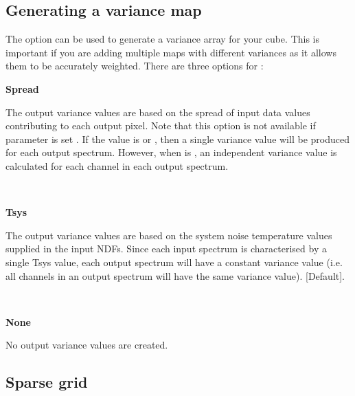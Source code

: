 \documentclass[11pt,oneside,chapters]{starlink}
\begin{document}
\subsection{Generating a variance map}

The option  can be used to generate a variance array for
your cube. This is important if you are adding multiple maps with
different variances as it allows them to be accurately weighted. There
are three options for :

\begin{center}
\begin{minipage}[t]{0.12\linewidth}
\textbf{Spread}
\end{minipage}
\begin{minipage}[t]{0.8\linewidth}
The output variance values are based on the spread of input data
values contributing to each output pixel. Note that this option is not
available if parameter  is set . If the
 value is  or , then a single
variance value will be produced for each output spectrum. However,
when  is , an independent variance value is
calculated for each channel in each output spectrum.
\end{minipage}
\vspace{0.7cm}\\
\begin{minipage}[t]{0.12\linewidth}
\textbf{Tsys}
\end{minipage}
\begin{minipage}[t]{0.8\linewidth}
The output variance values are based on the system noise temperature
values supplied in the input NDFs. Since each input spectrum is
characterised by a single Tsys value, each output spectrum will have a
constant variance value (i.e. all channels in an output spectrum will
have the same variance value). [Default].
\end{minipage}
\vspace{0.7cm}\\
\begin{minipage}[t]{0.12\linewidth}
\textbf{None}
\end{minipage}
\begin{minipage}[t]{0.8\linewidth}
 No output variance values are created.\\
\end{minipage}
\end{center}

\subsection{Sparse grid}
\end{document}
